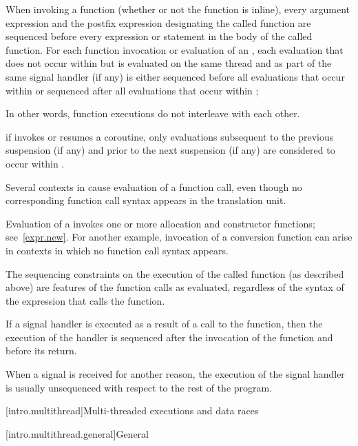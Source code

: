 \pnum
When invoking a function (whether or not the function is inline),
every argument expression and
the postfix expression designating the called function
are sequenced before every expression or statement
in the body of the called function.
For each function invocation or
evaluation of an  ,
each evaluation that does not occur within  but
is evaluated on the same thread and as part of the same signal handler (if any)
is either sequenced before all evaluations that occur within 
or sequenced after all evaluations that occur within ;
\begin{footnote}
In other words,
function executions do not interleave with each other.
\end{footnote}
if  invokes or resumes a coroutine,
only evaluations
subsequent to the previous suspension (if any) and
prior to the next suspension (if any)
are considered to occur within .

Several contexts in \Cpp{} cause evaluation of a function call, even
though no corresponding function call syntax appears in the translation
unit.
\begin{example}
Evaluation of a  invokes one or more allocation
and constructor functions; see~\ref{expr.new}. For another example,
invocation of a conversion function can arise in
contexts in which no function call syntax appears.
\end{example}
The sequencing constraints on the execution of the called function (as
described above) are features of the function calls as evaluated,
regardless of the syntax of the expression that calls the function.%
%

%
%
\pnum
If a signal handler is executed as a result of a call to the 
function, then the execution of the handler is sequenced after the invocation
of the  function and before its return.
\begin{note}
When a signal is received for another reason, the execution of the
signal handler is usually unsequenced with respect to the rest of the program.
\end{note}

[intro.multithread]{Multi-threaded executions and data races}

[intro.multithread.general]{General}

